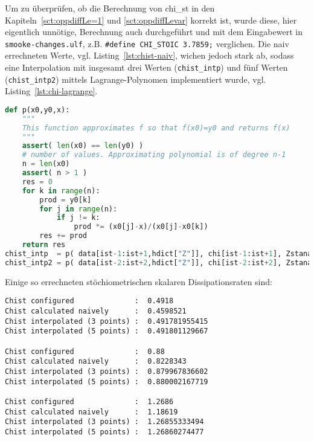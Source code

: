 \label{pg:chistproblem}
Um zu überprüfen, ob die Berechnung von \gls{chi_st} in den Kapiteln~\ref{sct:oppdiffLe=1} und \ref{sct:oppdiffLevar} korrekt ist, wurde diese, hier eigentlich unnötige, Berechnung auch durchgeführt und mit dem Eingabewert in \lstinline!smooke-changes.ulf!, z.B. \lstinline!#define CHI_STOIC 3.7859;! verglichen. Die naiv errechneten Werte, vgl. Listing~\ref{lst:chist-naiv}, wichen jedoch stark ab, sodass eine Interpolation mit insgesamt drei Werten (\lstinline!chist_intp!) und fünf Werten (\lstinline!chist_intp2!) mittels Lagrange-Polynomen implementiert wurde, vgl. Listing~\ref{lst:chi-lagrange}.
\begin{lstlisting}[language=Python, label=lst:chi-lagrange, caption={Lagrange-Interpolation für \gls{chi_st}}]
def p(x0,y0,x):
    """
    This function approximates f so that f(x0)=y0 and returns f(x)
    """
    assert( len(x0) == len(y0) )
    # number of values. Approximating polynomial is of degree n-1
    n = len(x0)
    assert( n > 1 )
    res = 0
    for k in range(n):
        prod = y0[k]
        for j in range(n):
            if j != k:
                prod *= (x0[j]-x)/(x0[j]-x0[k])
        res += prod
    return res
chist_intp  = p( data[ist-1:ist+1,hdict["Z"]], chi[ist-1:ist+1], Zstanal )
chist_intp2 = p( data[ist-2:ist+2,hdict["Z"]], chi[ist-2:ist+2], Zstanal )
\end{lstlisting}
Einige so errechneten stöchiometrischen skalaren Dissipationsraten sind:
\begin{lstlisting}
Chist configured              :  0.4918
Chist calculated naively      :  0.4598521
Chist interpolated (3 points) :  0.491781955415
Chist interpolated (5 points) :  0.491801129667

Chist configured              :  0.88
Chist calculated naively      :  0.8228343
Chist interpolated (3 points) :  0.879967836602
Chist interpolated (5 points) :  0.880002167719

Chist configured              :  1.2686
Chist calculated naively      :  1.18619
Chist interpolated (3 points) :  1.26855333494
Chist interpolated (5 points) :  1.26860274477
\end{lstlisting}\vspace{-2\baselineskip}
%
%
%

